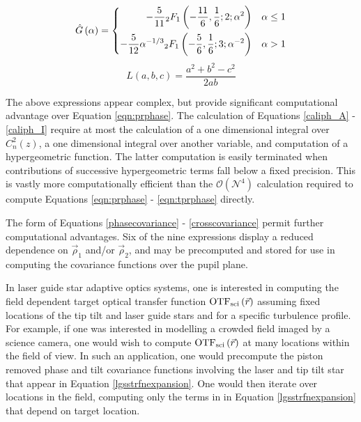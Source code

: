 \begin{equation}\label{G_hat_eqn}
\hat{G}\left(\alpha\right) = 
\left\{
\begin{aligned}
-\frac{5}{11} \vphantom{F}_{2}F_{1}\left(-\frac{11}{6}, \frac{1}{6};2; \alpha^{2}\right)              & \quad \alpha\le 1 \\
-\frac{5}{12} \alpha^{-1/3} \vphantom{F}_{2}F_{1}\left(-\frac{5}{6}, \frac{1}{6};3; \alpha^{-2}\right)  & \quad \alpha > 1
\end{aligned}
\right.
\end{equation}
\begin{equation}
L\left(a, b, c\right) = \frac{a^{2} + b^{2} - c^{2}}{2 a b}
\end{equation}

The above expressions appear complex, but provide significant
computational advantage over Equation \ref{eqn:prphase}.  The
calculation of Equations \ref{caliph_A} - \ref{caliph_I} require at
most the calculation of a one dimensional integral over
$C_{n}^{2}(z)$, a one dimensional integral over another variable, and
computation of a hypergeometric function.  The latter computation is
easily terminated when contributions of successive hypergeometric
terms fall below a fixed precision.  This is vastly more
computationally efficient than the $\mathcal{O}(\mathcal{N}^{4})$
calculation required to compute Equations \ref{eqn:prphase} -
\ref{eqn:tprphase} directly.

The form of Equations \ref{phasecovariance} - \ref{crosscovariance}
permit further computational advantages.  Six of the nine expressions
display a reduced dependence on $\vec{\rho}_{1}$ and/or
$\vec{\rho}_{2}$, and may be precomputed and stored for use in
computing the covariance functions over the pupil plane.

In laser guide star adaptive optics systems, one is interested in
computing the field dependent target optical transfer function
${\rm OTF}_{\rm sci}\left(\vec{r}\right)$ assuming fixed locations of
the tip tilt and laser guide stars and for a specific turbulence
profile.  For example, if one was interested in modelling a crowded
field imaged by a science camera, one would wish to compute ${\rm OTF}_{\rm
  sci}\left(\vec{r}\right)$ at many locations within the field
of view.  In such an application, one would precompute the piston
removed phase and tilt covariance functions involving the laser and
tip tilt star that appear in Equation \ref{lgsstrfnexpansion}.  One
would then iterate over locations in the field, computing only the
terms in in Equation \ref{lgsstrfnexpansion} that depend on target
location.


